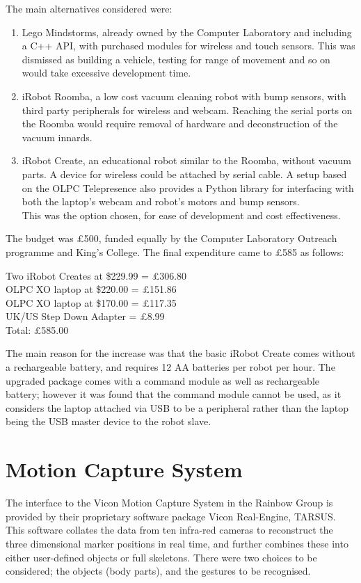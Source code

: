 \documentclass[12pt,a4,notitlepage]{report}
\renewcommand{\_}{\texttt{\symbol{95}}}
\newcommand{\<}{\texttt{\symbol{60}}}
\renewcommand{\>}{\texttt{\symbol{62}}}
\begin{document}
The main alternatives considered were:
\begin{enumerate}
\item Lego Mindstorms, already owned by the Computer Laboratory and including a C++ API, with purchased modules for wireless and touch sensors. This was dismissed as building a vehicle, testing for range of movement and so on would take excessive development time.
\item iRobot Roomba, a low cost vacuum cleaning robot with bump sensors, with third party peripherals for wireless and webcam. Reaching the serial ports on the Roomba would require removal of hardware and deconstruction of the vacuum innards.
\item iRobot Create\cite{Create}, an educational robot similar to the Roomba, without vacuum parts. A device for wireless could be attached by serial cable. A setup based on the OLPC Telepresence\cite{OLPCtelepresence} also provides a Python library for interfacing with both the laptop's webcam and robot's motors and bump sensors. \\
This was the option chosen, for ease of development and cost effectiveness.
\end{enumerate}

The budget was \pounds 500, funded equally by the Computer Laboratory Outreach programme and King's College. The final expenditure came to \pounds 585 as follows:

Two iRobot Creates at \$229.99 = \pounds 306.80 \\
OLPC XO laptop at \$220.00 = \pounds 151.86 \\
OLPC XO laptop at \$170.00 = \pounds 117.35 \\
UK/US Step Down Adapter = \pounds 8.99 \\
Total: \pounds 585.00

The main reason for the increase was that the basic iRobot Create comes without a rechargeable battery, and requires 12 AA batteries per robot per hour. The upgraded package comes with a command module as well as rechargeable battery; however it was found that the command module cannot be used, as it considers the laptop attached via USB to be a peripheral rather than the laptop being the USB master device to the robot slave.

\section{Motion Capture System}

The interface to the Vicon Motion Capture System in the Rainbow Group is provided by their proprietary software package Vicon Real-Engine, TARSUS\cite{Vicon}. This software collates the data from ten infra-red cameras to reconstruct the three dimensional marker positions in real time, and further combines these into either user-defined objects or full skeletons. There were two choices to be considered; the objects (body parts), and the gestures to be recognised.
\end{document}
